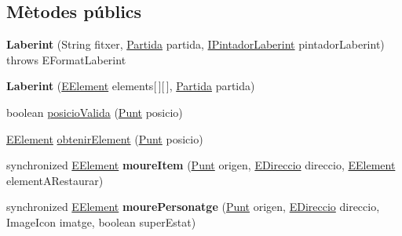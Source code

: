 \subsection*{Mètodes públics}
\begin{DoxyCompactItemize}
\item 
\hypertarget{classlogica_1_1laberints_1_1_laberint_a17654384a8abae885f2cf50c9fa7cfa1}{{\bfseries Laberint} (String fitxer, \hyperlink{classlogica_1_1_partida}{Partida} partida, \hyperlink{interfaceinterficie_1_1_i_pintador_laberint}{I\+Pintador\+Laberint} pintador\+Laberint)  throws E\+Format\+Laberint}\label{classlogica_1_1laberints_1_1_laberint_a17654384a8abae885f2cf50c9fa7cfa1}

\item 
\hypertarget{classlogica_1_1laberints_1_1_laberint_aadddfcf8789a27b7bf2fae055801abe5}{{\bfseries Laberint} (\hyperlink{enumlogica_1_1enumeracions_1_1_e_element}{E\+Element} elements\mbox{[}$\,$\mbox{]}\mbox{[}$\,$\mbox{]}, \hyperlink{classlogica_1_1_partida}{Partida} partida)}\label{classlogica_1_1laberints_1_1_laberint_aadddfcf8789a27b7bf2fae055801abe5}

\item 
boolean \hyperlink{classlogica_1_1laberints_1_1_laberint_a91596ecf3d32f4dfd732c45bec1bd02e}{posicio\+Valida} (\hyperlink{classlogica_1_1_punt}{Punt} posicio)
\item 
\hyperlink{enumlogica_1_1enumeracions_1_1_e_element}{E\+Element} \hyperlink{classlogica_1_1laberints_1_1_laberint_a99ff8e97f8082b5a0d9dd7964773216a}{obtenir\+Element} (\hyperlink{classlogica_1_1_punt}{Punt} posicio)
\item 
\hypertarget{classlogica_1_1laberints_1_1_laberint_a94464a4d4905f10bdad3ef4d4ec2ebb4}{synchronized \hyperlink{enumlogica_1_1enumeracions_1_1_e_element}{E\+Element} {\bfseries moure\+Item} (\hyperlink{classlogica_1_1_punt}{Punt} origen, \hyperlink{enumlogica_1_1enumeracions_1_1_e_direccio}{E\+Direccio} direccio, \hyperlink{enumlogica_1_1enumeracions_1_1_e_element}{E\+Element} element\+A\+Restaurar)}\label{classlogica_1_1laberints_1_1_laberint_a94464a4d4905f10bdad3ef4d4ec2ebb4}

\item 
\hypertarget{classlogica_1_1laberints_1_1_laberint_abfe7812a958e1a1de08255bb31ceb361}{synchronized \hyperlink{enumlogica_1_1enumeracions_1_1_e_element}{E\+Element} {\bfseries moure\+Personatge} (\hyperlink{classlogica_1_1_punt}{Punt} origen, \hyperlink{enumlogica_1_1enumeracions_1_1_e_direccio}{E\+Direccio} direccio, Image\+Icon imatge, boolean super\+Estat)}\label{classlogica_1_1laberints_1_1_laberint_abfe7812a958e1a1de08255bb31ceb361}


\end{DoxyCompactItemize}
